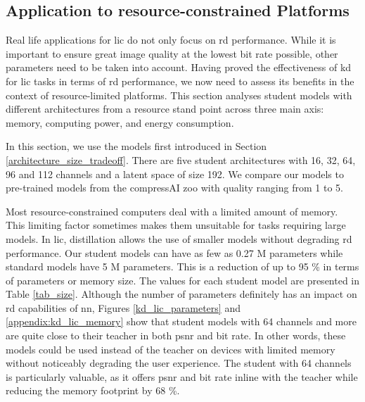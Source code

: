 \documentclass{article}
\begin{document}
\subsection{Application to resource-constrained Platforms}
\label{application_resource_contrained_platforms}
Real life applications for \acrshort{lic} do not only focus on \acrshort{rd} performance. While it is important to ensure great image quality at the lowest bit rate possible, other parameters need to be taken into account. Having proved the effectiveness of \acrshort{kd} for \acrshort{lic} tasks in terms of \acrshort{rd} performance, we now need to assess its benefits in the context of resource-limited platforms. This section analyses student models with different architectures from a resource stand point across three main axis: memory, computing power, and energy consumption.

In this section, we use the models first introduced in Section \ref{architecture_size_tradeoff}. There are five student architectures with 16, 32, 64, 96 and 112 channels and a latent space of size 192. We compare our models to pre-trained models from the compressAI zoo with \textsf{quality} ranging from 1 to 5.

Most resource-constrained computers deal with a limited amount of memory. This limiting factor sometimes makes them unsuitable for tasks requiring large models. In \acrshort{lic}, distillation allows the use of smaller models without degrading \acrshort{rd} performance. Our student models can have as few as 0.27 M parameters while standard models have 5 M parameters. This is a reduction of up to 95 \% in terms of parameters or memory size. The values for each student model are presented in Table \ref{tab_size}. Although the number of parameters definitely has an impact on \acrshort{rd} capabilities of \acrshort{nn}, Figures \ref{kd_lic_parameters} and \ref{appendix:kd_lic_memory} show that student models with 64 channels and more are quite close to their teacher in both \acrshort{psnr} and bit rate. In other words, these models could be used instead of the teacher on devices with limited memory without noticeably degrading the user experience. The student with 64 channels is particularly valuable, as it offers \acrshort{psnr} and bit rate inline with the teacher while reducing the memory footprint by 68 \%.
\end{document}
